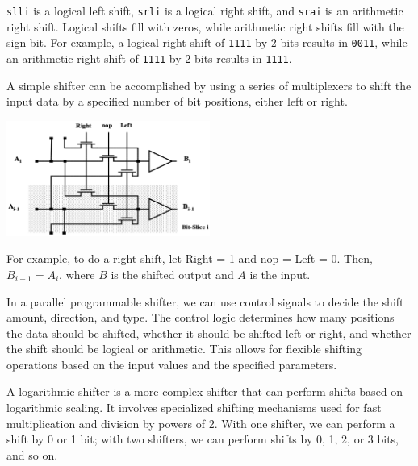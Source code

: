 \verb|slli| is a logical left shift, \verb|srli| is a logical right shift, and \verb|srai| is an arithmetic right shift. Logical shifts fill with zeros, while arithmetic right shifts fill with the sign bit. For example, a logical right shift of \verb|1111| by 2 bits results in \verb|0011|, while an arithmetic right shift of \verb|1111| by 2 bits results in \verb|1111|. 

A simple shifter can be accomplished by using a series of multiplexers to shift the input data by a specified number of bit positions, either left or right.
\begin{center}
  \includegraphics[width=0.5\textwidth]{Figure/shifter_1.png}
\end{center}

For example, to do a right shift, let Right = 1 and nop = Left = 0. Then, \(B_{i-1} = A_i\), where \(B\) is the shifted output and \(A\) is the input. 

In a parallel programmable shifter, we can use control signals to decide the shift amount, direction, and type. The control logic determines how many positions the data should be shifted, whether it should be shifted left or right, and whether the shift should be logical or arithmetic. This allows for flexible shifting operations based on the input values and the specified parameters.

A logarithmic shifter is a more complex shifter that can perform shifts based on logarithmic scaling. It involves specialized shifting mechanisms used for fast multiplication and division by powers of 2. With one shifter, we can perform a shift by 0 or 1 bit; with two shifters, we can perform shifts by 0, 1, 2, or 3 bits, and so on.
